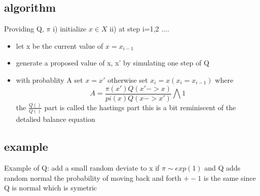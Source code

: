 \documentclass[12pt]{report}
\begin{document}
\subsection{algorithm}
Providing Q, $\pi$\newline
i) initialize $x\in X$\newline
ii) at step i=1,2 ....\newline
\begin{itemize}
\item let x be the current value of $x=x_{i-1}$
\item generate a proposed value of x, x' by simulating one step of Q
\item with probablity A set $x=x'$ otherwise set $x_i=x (x_i=x_{i-1})$ where
\begin{equation}
A=\frac{\pi(x')Q(x'->x)}{pi(x)Q(x->x')} \bigwedge 1
\end{equation}
the $\frac{Q()}{Q()}$ part is called the hastings part\newline
this is a bit reminiscent of the detalied balance equation
\end{itemize}

\subsection{example}
Example of Q: add a small random deviate to x if $\pi \sim exp(1)$ and Q adds random normal the probability of moving back and forth $+-1$ is the same since Q is normal which is symetric
\end{document}
